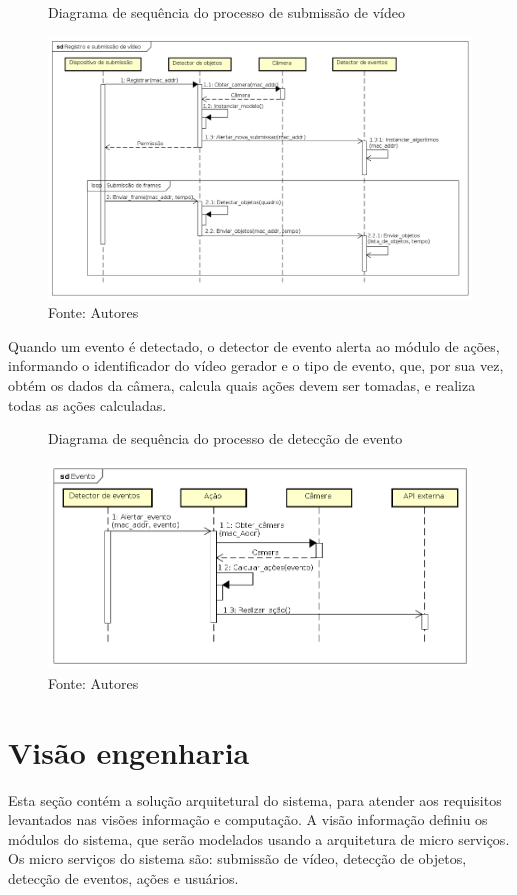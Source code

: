 \documentclass[]{politex}
\begin{document}
\begin{figure}[H]
    \centering
    \caption{Diagrama de sequência do processo de submissão de vídeo}
    \includegraphics[width=\textwidth]{Registro_e_submissao_video}
    \caption*{Fonte: Autores}
    \label{fig:registro}
\end{figure}

Quando um evento é detectado, o detector de evento alerta ao módulo de ações, informando o identificador do vídeo gerador e o tipo de evento, que, por sua vez, obtém os dados da câmera, calcula quais ações devem ser tomadas, e realiza todas as ações calculadas.

\begin{figure}[H]
    \centering
    \caption{Diagrama de sequência do processo de detecção de evento}
    \includegraphics[width=\textwidth]{Evento}
    \caption*{Fonte: Autores}
    \label{fig:evento}
\end{figure}

\section{Visão engenharia}
Esta seção contém a solução arquitetural do sistema, para atender aos requisitos levantados nas visões informação e computação. A visão informação definiu os módulos do sistema, que serão modelados usando a arquitetura de micro serviços. Os micro serviços do sistema são: submissão de vídeo, detecção de objetos, detecção de eventos, ações e usuários.
\end{document}
